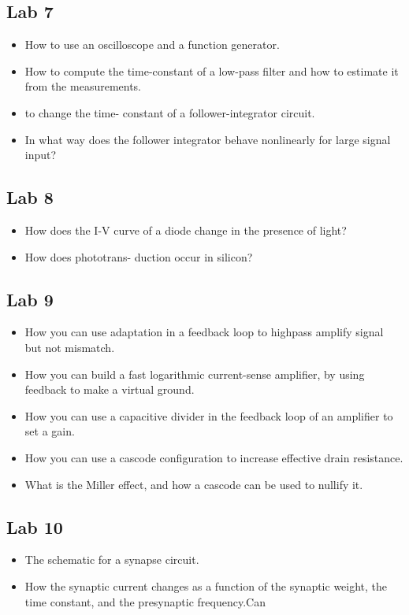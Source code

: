 \subsection{Lab 7}
\begin{itemize}
\item How to use an oscilloscope and a function generator. \item How to compute the time-constant of
a low-pass filter and how to estimate it from the measurements. \item  to change the time-
constant of a follower-integrator circuit. \item In what way does the follower integrator behave
nonlinearly for large signal input?
\end{itemize}


\subsection{Lab 8}
\begin{itemize}
\item How does the I-V curve of a diode change in the presence of light? \item How does phototrans-
duction occur in silicon?
\end{itemize}


\subsection{Lab 9}
\begin{itemize}
\item How you can use adaptation in a feedback loop to highpass amplify signal but not mismatch.
\item How you can build a fast logarithmic current-sense amplifier, by using feedback to make a
virtual ground. \item How you can use a capacitive divider in the feedback loop of an amplifier to
set a gain. \item How you can use a cascode configuration to increase effective drain resistance.
\item What is the Miller effect, and how a cascode can be used to nullify it.
\end{itemize}


\subsection{Lab 10}
\begin{itemize}
\item The schematic for a synapse circuit. \item How the synaptic current changes as a function of the
synaptic weight, the time constant, and the presynaptic frequency.Can
\end{itemize}


